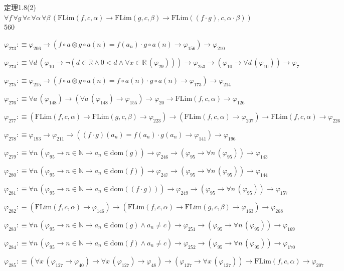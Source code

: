 \begin{fullproof}{定理1.8(2)}{$\forall f\,\forall g\,\forall c\,\forall \alpha\,\forall \beta\,(\mathrm{FLim}(f,c,\alpha) \to \mathrm{FLim}(g,c,\beta) \to \mathrm{FLim}((f \cdot g),c,\alpha \cdot \beta))$}{560}
\begin{abbrevlist}
\item $\varphi_{273} :\equiv \varphi_{206} \to (f \circ a \otimes g \circ a(n) = f(a_{n}) \cdot g \circ a(n) \to \varphi_{156}) \to \varphi_{210}$
\item $\varphi_{274} :\equiv \forall d\,(\varphi_{10} \to \neg (d \in \mathbb{R} \land 0 < d \land \forall x \in \mathbb{R}\,(\varphi_{29}))) \to \varphi_{253} \to (\varphi_{10} \to \forall d\,(\varphi_{10})) \to \varphi_{7}$
\item $\varphi_{275} :\equiv \varphi_{215} \to (f \circ a \otimes g \circ a(n) = f \circ a(n) \cdot g \circ a(n) \to \varphi_{173}) \to \varphi_{214}$
\item $\varphi_{276} :\equiv \forall a\,(\varphi_{148}) \to (\forall a\,(\varphi_{148}) \to \varphi_{155}) \to \varphi_{20} \to \mathrm{FLim}(f,c,\alpha) \to \varphi_{126}$
\item $\varphi_{277} :\equiv (\mathrm{FLim}(f,c,\alpha) \to \mathrm{FLim}(g,c,\beta) \to \varphi_{223}) \to (\mathrm{FLim}(f,c,\alpha) \to \varphi_{207}) \to \mathrm{FLim}(f,c,\alpha) \to \varphi_{226}$
\item $\varphi_{278} :\equiv \varphi_{193} \to \varphi_{211} \to ((f \cdot g)(a_{n}) = f(a_{n}) \cdot g(a_{n}) \to \varphi_{141}) \to \varphi_{196}$
\item $\varphi_{279} :\equiv \forall n\,(\varphi_{95} \to n \in \mathbb{N} \to a_{n} \in \mathrm{dom}(g)) \to \varphi_{246} \to (\varphi_{95} \to \forall n\,(\varphi_{95})) \to \varphi_{143}$
\item $\varphi_{280} :\equiv \forall n\,(\varphi_{95} \to n \in \mathbb{N} \to a_{n} \in \mathrm{dom}(f)) \to \varphi_{247} \to (\varphi_{95} \to \forall n\,(\varphi_{95})) \to \varphi_{144}$
\item $\varphi_{281} :\equiv \forall n\,(\varphi_{95} \to n \in \mathbb{N} \to a_{n} \in \mathrm{dom}((f \cdot g))) \to \varphi_{249} \to (\varphi_{95} \to \forall n\,(\varphi_{95})) \to \varphi_{157}$
\item $\varphi_{282} :\equiv (\mathrm{FLim}(f,c,\alpha) \to \varphi_{146}) \to (\mathrm{FLim}(f,c,\alpha) \to \mathrm{FLim}(g,c,\beta) \to \varphi_{163}) \to \varphi_{268}$
\item $\varphi_{283} :\equiv \forall n\,(\varphi_{95} \to n \in \mathbb{N} \to a_{n} \in \mathrm{dom}(g) \land a_{n} \neq c) \to \varphi_{251} \to (\varphi_{95} \to \forall n\,(\varphi_{95})) \to \varphi_{169}$
\item $\varphi_{284} :\equiv \forall n\,(\varphi_{95} \to n \in \mathbb{N} \to a_{n} \in \mathrm{dom}(f) \land a_{n} \neq c) \to \varphi_{252} \to (\varphi_{95} \to \forall n\,(\varphi_{95})) \to \varphi_{170}$
\item $\varphi_{285} :\equiv (\forall x\,(\varphi_{127} \to \varphi_{40}) \to \forall x\,(\varphi_{127}) \to \varphi_{48}) \to (\varphi_{127} \to \forall x\,(\varphi_{127})) \to \mathrm{FLim}(f,c,\alpha) \to \varphi_{207}$
\end{abbrevlist}
\end{fullproof}
